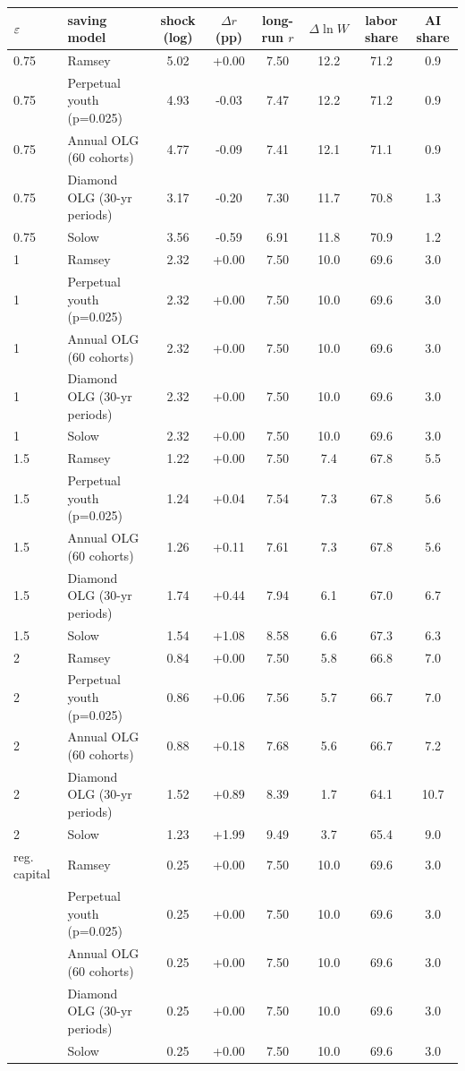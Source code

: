 \begin{tabular}{llcccccc}\toprule
$\varepsilon$ & saving model & shock (log) & $\Delta r$ (pp) & long-run $r$ & $\Delta\ln W$ & labor share & AI share\\\midrule
0.75 & Ramsey & 5.02 & +0.00 & 7.50 & 12.2 & 71.2 & 0.9\\
0.75 & Perpetual youth (p=0.025) & 4.93 & -0.03 & 7.47 & 12.2 & 71.2 & 0.9\\
0.75 & Annual OLG (60 cohorts) & 4.77 & -0.09 & 7.41 & 12.1 & 71.1 & 0.9\\
0.75 & Diamond OLG (30-yr periods) & 3.17 & -0.20 & 7.30 & 11.7 & 70.8 & 1.3\\
0.75 & Solow & 3.56 & -0.59 & 6.91 & 11.8 & 70.9 & 1.2\\
\midrule
1 & Ramsey & 2.32 & +0.00 & 7.50 & 10.0 & 69.6 & 3.0\\
1 & Perpetual youth (p=0.025) & 2.32 & +0.00 & 7.50 & 10.0 & 69.6 & 3.0\\
1 & Annual OLG (60 cohorts) & 2.32 & +0.00 & 7.50 & 10.0 & 69.6 & 3.0\\
1 & Diamond OLG (30-yr periods) & 2.32 & +0.00 & 7.50 & 10.0 & 69.6 & 3.0\\
1 & Solow & 2.32 & +0.00 & 7.50 & 10.0 & 69.6 & 3.0\\
\midrule
1.5 & Ramsey & 1.22 & +0.00 & 7.50 & 7.4 & 67.8 & 5.5\\
1.5 & Perpetual youth (p=0.025) & 1.24 & +0.04 & 7.54 & 7.3 & 67.8 & 5.6\\
1.5 & Annual OLG (60 cohorts) & 1.26 & +0.11 & 7.61 & 7.3 & 67.8 & 5.6\\
1.5 & Diamond OLG (30-yr periods) & 1.74 & +0.44 & 7.94 & 6.1 & 67.0 & 6.7\\
1.5 & Solow & 1.54 & +1.08 & 8.58 & 6.6 & 67.3 & 6.3\\
\midrule
2 & Ramsey & 0.84 & +0.00 & 7.50 & 5.8 & 66.8 & 7.0\\
2 & Perpetual youth (p=0.025) & 0.86 & +0.06 & 7.56 & 5.7 & 66.7 & 7.0\\
2 & Annual OLG (60 cohorts) & 0.88 & +0.18 & 7.68 & 5.6 & 66.7 & 7.2\\
2 & Diamond OLG (30-yr periods) & 1.52 & +0.89 & 8.39 & 1.7 & 64.1 & 10.7\\
2 & Solow & 1.23 & +1.99 & 9.49 & 3.7 & 65.4 & 9.0\\
\midrule
reg. capital & Ramsey & 0.25 & +0.00 & 7.50 & 10.0 & 69.6 & 3.0\\
 & Perpetual youth (p=0.025) & 0.25 & +0.00 & 7.50 & 10.0 & 69.6 & 3.0\\
 & Annual OLG (60 cohorts) & 0.25 & +0.00 & 7.50 & 10.0 & 69.6 & 3.0\\
 & Diamond OLG (30-yr periods) & 0.25 & +0.00 & 7.50 & 10.0 & 69.6 & 3.0\\
 & Solow & 0.25 & +0.00 & 7.50 & 10.0 & 69.6 & 3.0\\
\bottomrule\end{tabular}
